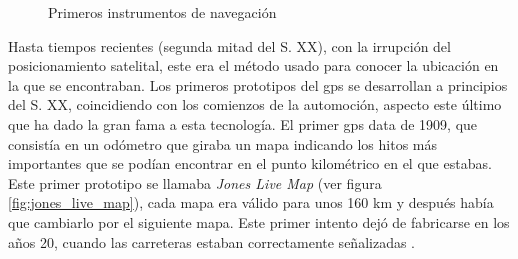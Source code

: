 \begin{figure}[hbtp]
	\begin{adjustbox}{minipage=\linewidth, fbox}
		\centering
		\hspace{10mm}
	\end{adjustbox}
	\caption{Primeros instrumentos de navegación}
	\label{fig:sextante_astrolabio}
\end{figure}

Hasta tiempos recientes (segunda mitad del S. XX), con la irrupción del posicionamiento satelital, este era el método usado para conocer la ubicación en la que se encontraban.
Los primeros prototipos del gps se desarrollan a principios del S. XX, coincidiendo con los comienzos de la automoción, aspecto este último que ha dado la gran fama a esta tecnología.
El primer gps data de 1909, que consistía en un odómetro que giraba un mapa indicando los hitos más importantes que se podían encontrar en el punto kilométrico en el que estabas.
Este primer prototipo se llamaba \textit{Jones Live Map} (ver figura \ref{fig:jones_live_map}), cada mapa era válido para unos 160 km y después había que cambiarlo por el siguiente mapa. Este primer intento dejó de fabricarse en los años 20, cuando las carreteras estaban correctamente señalizadas \cite{GPS12}.

